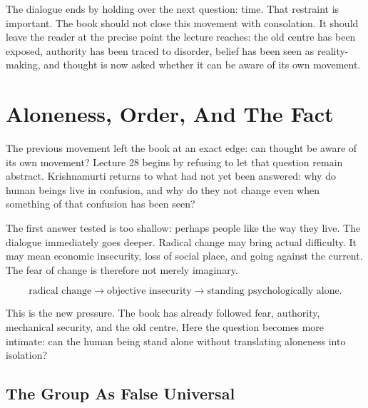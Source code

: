 \documentclass[11pt,oneside]{book}
\begin{document}
The dialogue ends by holding over the next question: time. That restraint is important. The book should not close this movement with consolation. It should leave the reader at the precise point the lecture reaches: the old centre has been exposed, authority has been traced to disorder, belief has been seen as reality-making, and thought is now asked whether it can be aware of its own movement.


\chapter{Aloneness, Order, And The Fact}

The previous movement left the book at an exact edge: can thought be aware of its own movement? Lecture 28 begins by refusing to let that question remain abstract. Krishnamurti returns to what had not yet been answered: why do human beings live in confusion, and why do they not change even when something of that confusion has been seen?

The first answer tested is too shallow: perhaps people like the way they live. The dialogue immediately goes deeper. Radical change may bring actual difficulty. It may mean economic insecurity, loss of social place, and going against the current. The fear of change is therefore not merely imaginary.

\begin{equation}
\text{radical change}
\longrightarrow
\text{objective insecurity}
\longrightarrow
\text{standing psychologically alone}.
\end{equation}

This is the new pressure. The book has already followed fear, authority, mechanical security, and the old centre. Here the question becomes more intimate: can the human being stand alone without translating aloneness into isolation?

\section{The Group As False Universal}
\end{document}
